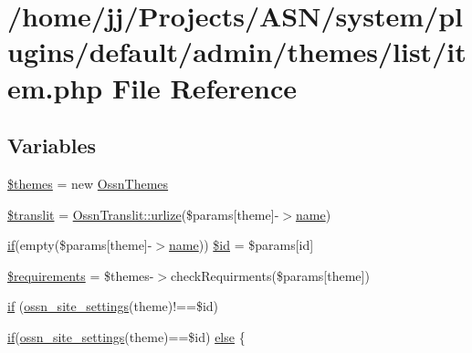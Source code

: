 \hypertarget{system_2plugins_2default_2admin_2themes_2list_2item_8php}{}\section{/home/jj/\+Projects/\+A\+S\+N/system/plugins/default/admin/themes/list/item.php File Reference}
\label{system_2plugins_2default_2admin_2themes_2list_2item_8php}
\subsection*{Variables}
\begin{DoxyCompactItemize}
\item 
\hyperlink{system_2plugins_2default_2admin_2themes_2list_2item_8php_ab8a3a0009c9eedf2350ba849c39c0580}{\$themes} = new \hyperlink{class_ossn_themes}{Ossn\+Themes}
\item 
\hyperlink{system_2plugins_2default_2admin_2themes_2list_2item_8php_afa48855eba22ae3bb558f75039d92eb6}{\$translit} = \hyperlink{class_ossn_translit_a5913009dee49e11a241b75c9dad52dd2}{Ossn\+Translit\+::urlize}(\$params\mbox{[}\textquotesingle{}theme\textquotesingle{}\mbox{]}-\/$>$\hyperlink{user_8php_a765af5e9671743530143a6d3670fd9a6}{name})
\item 
\hyperlink{jquery_8tokeninput_8js_ad8dd46a3cbc004569e34401e9e71771a}{if}(empty(\$params\mbox{[}\textquotesingle{}theme\textquotesingle{}\mbox{]}-\/$>$\hyperlink{user_8php_a765af5e9671743530143a6d3670fd9a6}{name})) \hyperlink{system_2plugins_2default_2admin_2themes_2list_2item_8php_aff5afe90f2deea121e79e3e3e12c21aa}{\$id} = \$params\mbox{[}\textquotesingle{}id\textquotesingle{}\mbox{]}
\item 
\hyperlink{system_2plugins_2default_2admin_2themes_2list_2item_8php_a244d94e62cffe97e11aa1633b809dfa1}{\$requirements} = \$themes-\/$>$check\+Requirments(\$params\mbox{[}\textquotesingle{}theme\textquotesingle{}\mbox{]})
\item 
\hyperlink{system_2plugins_2default_2admin_2themes_2list_2item_8php_aa56794e9bcefa38b9fc897bc948634f8}{if} (\hyperlink{ossn_8lib_8system_8php_a610e2045b8a86c09f777b4d82e24e34c}{ossn\+\_\+site\+\_\+settings}(\textquotesingle{}theme\textquotesingle{})!==\$id)
\item 
\hyperlink{jquery_8tokeninput_8js_ad8dd46a3cbc004569e34401e9e71771a}{if}(\hyperlink{ossn_8lib_8system_8php_a610e2045b8a86c09f777b4d82e24e34c}{ossn\+\_\+site\+\_\+settings}(\textquotesingle{}theme\textquotesingle{})==\$id) \hyperlink{system_2plugins_2default_2admin_2themes_2list_2item_8php_a74d7cf7101f5c2360425f00a411e997b}{else} \{
\end{DoxyCompactItemize}


